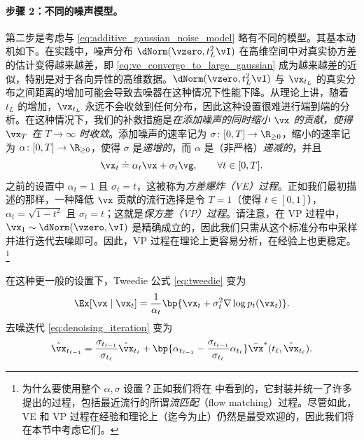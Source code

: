 \documentclass[../../book-main_zh.tex]{subfiles}
\begin{document}
\paragraph{步骤 2：不同的噪声模型。} 第二步是考虑与 \eqref{eq:additive_gaussian_noise_model} 略有不同的模型。其基本动机如下。在实践中，噪声分布 \(\dNorm(\vzero, t_{L}^{2}\vI)\) 在高维空间中对真实协方差的估计变得越来越差，即 \eqref{eq:ve_converge_to_large_gaussian} 成为越来越差的近似，特别是对于各向异性的高维数据。\(\dNorm(\vzero, t_{L}^{2}\vI)\) 与 \(\vx_{t_{L}}\) 的真实分布之间距离的增加可能会导致去噪器在这种情况下性能下降。从理论上讲，随着 \(t_{L}\) 的增加，\(\vx_{t_{L}}\) 永远不会收敛到任何分布，因此这种设置很难进行端到端的分析。在这种情况下，我们的补救措施是\textit{在添加噪声的同时缩小 \(\vx\) 的贡献，使得 \(\vx_{T}\) 在 \(T \to \infty\) 时收敛}。添加噪声的速率记为 \(\sigma \colon [0,
T] \to \R_{\geq 0}\)，缩小的速率记为 \(\alpha \colon [0, T] \to \R_{\geq 0}\)，使得 \(\sigma\) 是\textit{递增的}，而 \(\alpha\) 是（非严格）\textit{递减的}，并且
\begin{equation}\label{eq:gen_additive_gaussian_noise_model}
    \vx_{t} \doteq \alpha_{t}\vx + \sigma_{t}\vg, \qquad \forall t \in [0, T].
\end{equation}
之前的设置中 \(\alpha_{t} = 1\) 且 \(\sigma_{t} = t\)，这被称为\textit{方差爆炸（VE）过程}。正如我们最初描述的那样，一种降低 \(\vx\) 贡献的流行选择是令 \(T = 1\)（使得 \(t \in [0, 1]\)），\(\alpha_{t} = \sqrt{1 - t^{2}}\) 且 \(\sigma_{t} = t\)；这就是\textit{保方差（VP）过程}。请注意，在 VP 过程中，\(\vx_{1} \sim \dNorm(\vzero, \vI)\) 是精确成立的，因此我们只需从这个标准分布中采样并进行迭代去噪即可。因此，VP 过程在理论上更容易分析，在经验上也更稳定。\footnote{为什么要使用整个 \(\alpha,
    \sigma\) 设置？正如我们将在  中看到的，它封装并统一了许多提出的过程，包括最近流行的所谓\textit{流匹配}（flow matching）过程。尽管如此，VE 和 VP 过程在经验和理论上（迄今为止）仍然是最受欢迎的，因此我们将在本节中考虑它们。}

在这种更一般的设置下，Tweedie 公式 \eqref{eq:tweedie} 变为
\begin{equation}\label{eq:gen_tweedie}
    \Ex[\vx \mid \vx_{t}] = \frac{1}{\alpha_{t}}\bp{\vx_{t} +
    \sigma_{t}^{2}\nabla \log p_{t}(\vx_{t})}.
\end{equation}
去噪迭代 \eqref{eq:denoising_iteration} 变为
\begin{equation}\label{eq:gen_denoising_iteration}
    \hat{\vx}_{t_{\ell - 1}} = \frac{\sigma_{t_{\ell -
    1}}}{\sigma_{t_{\ell}}}\hat{\vx}_{t_{\ell}} + \bp{\alpha_{t_{\ell
        - 1}} - \frac{\sigma_{t_{\ell -
    1}}}{\sigma_{t_{\ell}}}\alpha_{t_{\ell}}}\bar{\vx}^{\ast}(t_{\ell},
    \hat{\vx}_{t_{\ell}}).
\end{equation}
\end{document}
